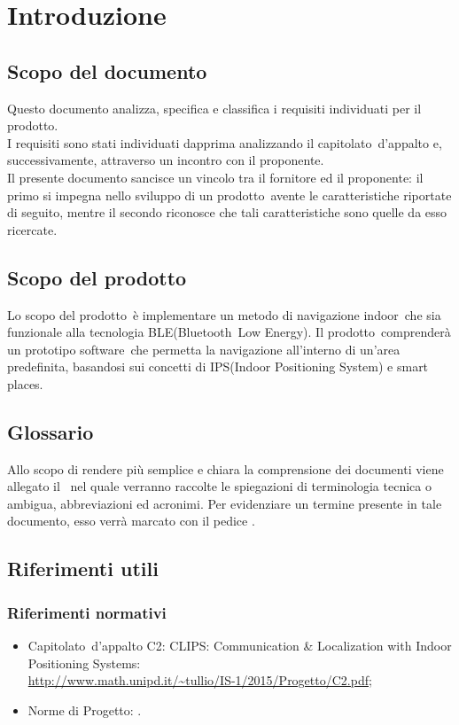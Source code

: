 \documentclass[../AnalisiDeiRequisiti.tex]{subfiles}
\begin{document}
\section{Introduzione}
	\subsection{Scopo del documento}
	Questo documento analizza, specifica e classifica i requisiti individuati per il prodotto\g.\\
	I requisiti sono stati individuati dapprima analizzando il capitolato\g\ d’appalto e, successivamente, attraverso un incontro con il proponente.\\
	Il presente documento sancisce un vincolo tra il fornitore ed il proponente: il primo si impegna nello sviluppo di un prodotto\g\ avente le caratteristiche riportate di seguito, mentre il secondo 				riconosce che tali caratteristiche sono quelle da esso ricercate.

	\subsection{Scopo del prodotto}
	Lo scopo del prodotto\g\ è implementare un metodo di navigazione indoor\g\ che sia funzionale alla tecnologia BLE\g(Bluetooth\g\ Low Energy). Il prodotto\g\ 
comprenderà un prototipo software\g\ che permetta la navigazione all’interno di un’area predefinita, basandosi sui concetti di IPS\g(Indoor Positioning System) e smart places\g.
	
	\subsection{Glossario} 
	Allo scopo di rendere più semplice e chiara la comprensione dei documenti viene allegato il \glossariov\ nel quale verranno raccolte le spiegazioni di  terminologia tecnica o  ambigua,
abbreviazioni ed acronimi. Per evidenziare un termine presente in tale documento, esso verrà marcato con il pedice \g.
	
	\subsection{Riferimenti utili}
		\subsubsection{Riferimenti normativi}
		\begin{itemize}
			\item Capitolato\g\ d’appalto C2: CLIPS\g: Communication \& Localization with Indoor Positioning Systems: \\\url{http://www.math.unipd.it/~tullio/IS-1/2015/Progetto/C2.pdf};
			\item Norme di Progetto: \normediprogettov.
		\end{itemize}
\end{document}
